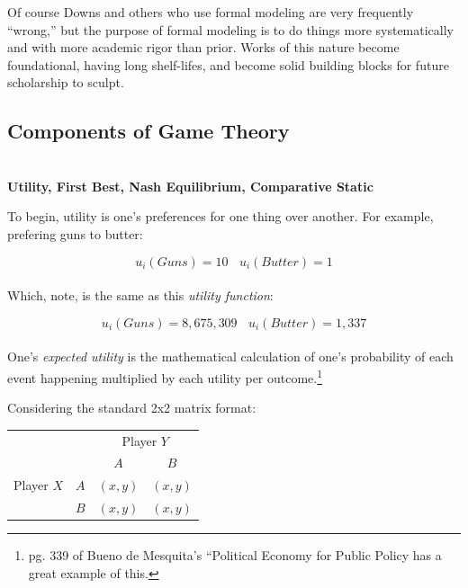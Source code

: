 \documentclass[12pt]{article}\usepackage[]{graphicx}\usepackage[]{color}
\begin{document}
\begin{flushleft}
Of course Downs and others who use formal modeling are very frequently ``wrong,'' but the purpose of formal modeling is to do things more systematically and with more academic rigor than prior. Works of this nature become foundational, having long shelf-lifes, and become solid building blocks for future scholarship to sculpt.


\subsection{Components of Game Theory}

\hfill \\

\noindent \textbf{Utility, First Best, Nash Equilibrium, Comparative Static}

\noindent To begin, utility is one's preferences for one thing over another. For example, prefering guns to butter:

$$ u_i(\textit{Guns}) = 10 ~~~~ u_i(\textit{Butter}) = 1 $$\\

\noindent Which, note, is the same as this \textit{utility function}:

$$ u_i(\textit{Guns}) = 8,675,309 ~~~~ u_i(\textit{Butter}) = 1,337 $$\\

One's \textit{expected utility} is the mathematical calculation of one's probability of each event happening multiplied by each utility per outcome.\footnote{pg. 339 of Bueno de Mesquita's ``Political Economy for Public Policy has a great example of this. }

 
\noindent Considering the standard 2x2 matrix format:

  \begin{table}[h!]
  \centering
    \setlength{\extrarowheight}{2pt}
    \begin{tabular}{cc|c|c|}
      & \multicolumn{1}{c}{} & \multicolumn{2}{c}{Player $Y$}\\
      & \multicolumn{1}{c}{} & \multicolumn{1}{c}{$A$}  & \multicolumn{1}{c}{$B$} \\\cline{3-4}
      {Player $X$}  & $A$ & $(x,y)$ & $(x,y)$ \\\cline{3-4} %
      & $B$ & $(x,y)$ & $(x,y)$ \\\cline{3-4}
    \end{tabular}
  \end{table}


\end{flushleft}
\end{document}

